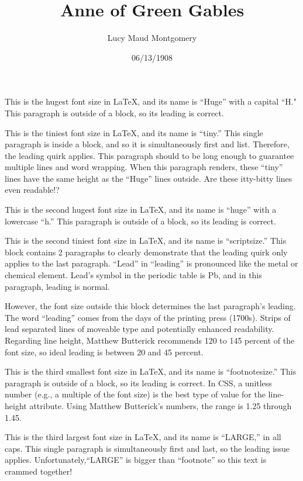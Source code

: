 \documentclass[a4paper]{article}
\title{Anne of Green Gables}
\author{Lucy Maud Montgomery}
\date{06/13/1908}
\begin{document}
\maketitle

\Huge This is the hugest font size in \LaTeX, and its name is ``Huge'' with a capital ``H." This paragraph is outside of a block, so its leading is correct.

{\tiny This is the tiniest font size in \LaTeX, and its name is ``tiny.'' This single paragraph is inside a block, and so it is simultaneously first and list. Therefore, the leading quirk applies. This paragraph should to be long enough to guarantee multiple lines and word wrapping. When this paragraph renders, these ``tiny'' lines have the same height as the ``Huge'' lines outside. Are these itty-bitty lines even readable!?}

\huge This is the second hugest font size in \LaTeX, and its name is ``huge'' with a lowercase ``h.'' This paragraph is outside of a block, so its leading is correct.

{\scriptsize This is the second tiniest font size in \LaTeX, and its name is ``scriptsize.'' This block contains 2 paragraphs to clearly demonstrate that the leading quirk only applies to the last paragraph. ``Lead'' in ``leading'' is pronounced like the metal or chemical element. Lead's symbol in the periodic table is Pb, and in this paragraph, leading is normal.

However, the font size outside this block determines the last paragraph's leading. The word ``leading'' comes from the days of the printing press (1700s). Strips of lead separated lines of moveable type and potentially enhanced readability. Regarding line height, Matthew Butterick recommends 120 to 145 percent of the font size, so ideal leading is between 20 and 45 percent.}

\footnotesize This is the third smallest font size in \LaTeX, and its name is ``footnotesize.'' This paragraph is outside of a block, so its leading is correct. In CSS, a unitless number (e.g., a multiple of the font size) is the best type of value for the line-height attribute.  Using Matthew Butterick's numbers, the range is 1.25 through 1.45.

{\LARGE This is the third largest font size in \LaTeX, and its name is ``LARGE,'' in all caps. This single paragraph is simultaneously first and last, so the leading issue applies. Unfortunately,``LARGE'' is bigger than ``footnote''  so this text is crammed together!}
\end{document}
